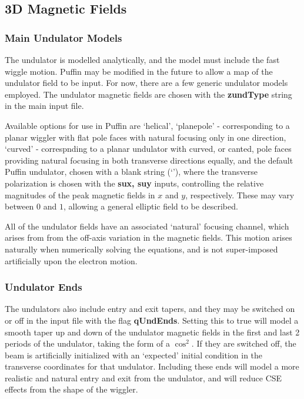 \documentclass[12pt]{article}%
\begin{document}
\subsection{3D Magnetic Fields}

\label{und-fields}

\subsubsection{Main Undulator Models}

The undulator is modelled analytically, and the model must include the fast wiggle motion. Puffin may be modified in the future to allow a map of the undulator field to be input. For now, there are a few generic undulator models employed. The undulator magnetic fields are chosen with the {\bf zundType} string in the main input file.

Available options for use in Puffin are `helical', `planepole' - corresponding to a planar wiggler with flat pole faces with natural focusing only in one direction, `curved' - correspnding to a planar undulator with curved, or canted, pole faces providing natural focusing in both transverse directions equally, and the default Puffin undulator, chosen with a blank string (`'), where the transverse polarization is chosen with the {\bf sux, suy} inputs, controlling the relative magnitudes of the peak magnetic fields in $x$ and $y$, respectively. These may vary between $0$ and $1$, allowing a general elliptic field to be described.

All of the undulator fields have an associated `natural' focusing channel, which arises from from the off-axis variation in the magnetic fields. This motion arises naturally when numerically solving the equations, and is not super-imposed artificially upon the electron motion.

\subsubsection{Undulator Ends}

The undulators also include entry and exit tapers, and they may be switched on or off in the input file with the flag {\bf qUndEnds}. Setting this to true will model a smooth taper up and down of the undulator magnetic fields in the first and last 2 periods of the undulator, taking the form of a $\cos^2$. If they are switched off, the beam is artificially initialized with an `expected' initial condition in the transverse coordinates for that undulator. Including these ends will model a more realistic and natural entry and exit from the undulator, and will reduce CSE effects from the shape of the wiggler.
\end{document}
